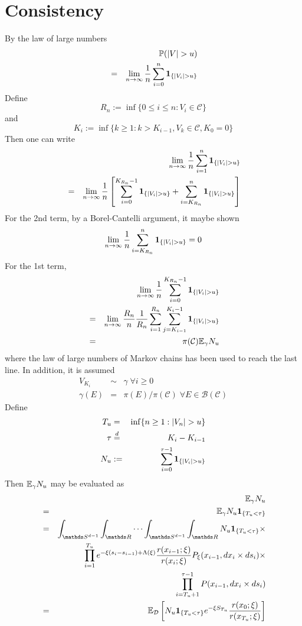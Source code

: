 \documentclass{article}
\begin{document}
\section{Consistency}\label{sec:consistency}
By the law of large numbers
\begin{eqnarray*}
  && \mathbb{P}(|V| > u) \\
  &=& \lim_{n \to \infty} {1 \over n} \sum_{i=0}^n \mathbf{1}_{\{|V_i| > u\}}
\end{eqnarray*}
Define
\[
R_n := \inf\{0 \leq i \leq n: V_i \in \mathcal C\}
\]
and
\[
K_i := \inf\{k \geq 1: k > K_{i-1}, V_k \in \mathcal C, K_0 = 0\}
\]
Then one can write
\begin{eqnarray*}
  && \lim_{n \to \infty} {1 \over n} \sum_{i=1}^n \mathbf{1}_{\{|V_i| > u\}} \\
  &=& \lim_{n \to \infty} {1 \over n} \left[
    \sum_{i=0}^{K_{R_n}-1} \mathbf{1}_{\{|V_i| > u\}} + \sum_{i=K_{R_n}}^n \mathbf{1}_{\{|V_i| > u\}}
\right]
\end{eqnarray*}
For the 2nd term, by a Borel-Cantelli argument, it maybe shown
\[
\lim_{n \to \infty} {1 \over n}\sum_{i=K_{R_n}}^n \mathbf{1}_{\{|V_i| > u\}} = 0
\]
For the 1st term,
\begin{eqnarray*}
&& \lim_{n \to \infty} {1 \over n} \sum_{i=0}^{K_{R_n}-1} \mathbf{1}_{\{|V_i| >
  u\}}  \\
&=& \lim_{n \to \infty} {R_n \over n} {1 \over R_n} \sum_{i=1}^{R_n}
\sum_{j=K_{i-1}}^{K_i-1}\mathbf{1}_{\{|V_i| > u\}} \\
&=& \pi(\mathcal C) \mathbb{E}_\gamma N_u
\end{eqnarray*}
where the law of large numbers of Markov chains has been used to reach
the last line. In addition, it is assumed
\begin{eqnarray*}
  V_{K_i} &\sim& \gamma \; \forall i \geq 0 \\
  \gamma(E) &=& \pi(E)/\pi(\mathcal C)\; \forall E \in \mathcal
  B(\mathcal C)
\end{eqnarray*}
Define
\begin{eqnarray*}
  T_u &=& \inf\{n \geq 1: |V_n| > u\} \\
  \tau &\overset{d}{=}& K_i - K_{i-1} \\
  N_u &:=& \sum_{i=0}^{\tau-1} \mathbf{1}_{\{|V_i| > u\}}  \\
\end{eqnarray*}
Then $\mathbb{E}_\gamma N_u$ may be evaluated as
\begin{eqnarray*}
  && \E_\gamma N_u \\
  &=& \E_\gamma N_u \1{T_u < \tau} \\
  &=& \int_{\mathds S^{d-1}} \int_{\mathds R} \cdots \int_{\mathds
    S^{d-1}} \int_{\mathds R} N_u \1{T_u < \tau} \times \\
  && \prod_{i=1}^{T_u} e^{-\xi(s_i - s_{i-1}) + \Lambda(\xi)}
  {r(x_{i-1}; \xi) \over r(x_{i}; \xi)}P_\xi(x_{i-1}, dx_i \times ds_i) \times \\
  && \prod_{i=T_u+1}^{\tau-1} P(x_{i-1}, dx_i \times d s_i) \\
  &=& \E_{\mathcal D} \left[
    N_u \1{T_u < \tau} e^{-\xi S_{T_u}} {r(x_0; \xi)
      \over r(x_{T_u}; \xi)}
  \right]
\end{eqnarray*}
\end{document}

